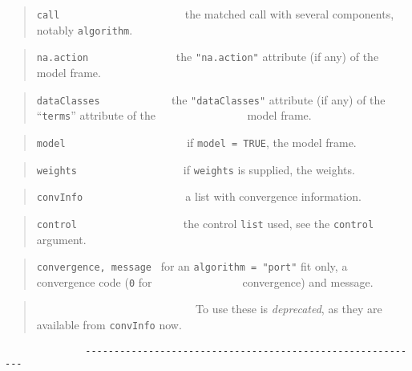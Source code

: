 \documentclass[
]{article}
\begin{document}
\begin{quote}
\texttt{call} ~ ~ ~ ~ ~ ~ ~ ~ ~ ~ ~ ~ ~ the matched call with several
components, notably \texttt{algorithm}.
\end{quote}

\begin{quote}
\texttt{na.action} ~ ~ ~ ~ ~ ~ ~ ~ ~ the \texttt{"na.action"} attribute
(if any) of the model frame.
\end{quote}

\begin{quote}
\texttt{dataClasses} ~ ~ ~ ~ ~ ~ ~ \(~\)the \texttt{"dataClasses"}
attribute (if any) of the ``\texttt{terms}'' attribute of the \newline
\(~~~~~~~~~~~~~~~~~~~~~~~~~~~~~~~~~~\) model frame.
\end{quote}

\begin{quote}
\texttt{model} ~ ~ ~ ~ ~ ~ ~ ~ ~ ~ ~ ~ ~if \texttt{model\ =\ TRUE}, the
model frame.
\end{quote}

\begin{quote}
\texttt{weights} ~ ~ ~ ~ ~ ~ ~ ~ ~ ~ ~ if \texttt{weights} is supplied,
the weights.
\end{quote}

\begin{quote}
\texttt{convInfo} ~ ~ ~ ~ ~ ~ ~ ~ ~ ~~ a list with convergence
information.
\end{quote}

\begin{quote}
\texttt{control} ~ ~ ~ ~ ~ ~ ~ ~ ~ ~ ~ the control \texttt{list} used,
see the \texttt{control} argument.
\end{quote}

\begin{quote}
\texttt{convergence,\ message} ~for an \texttt{algorithm\ =\ "port"} fit
only, a convergence code (\texttt{0} for \newline
\(~~~~~~~~~~~~~~~~~~~~~~~~~~~~~~~~~~~\)convergence) and message.
\end{quote}

\begin{quote}
~ ~ ~ ~ ~ ~ ~ ~ ~ ~ ~ ~ ~ ~ ~ ~ ~ To use these is \emph{deprecated}, as
they are available from \texttt{convInfo} now.
\end{quote}

\begin{verbatim}
              -----------------------------------------------------------
\end{verbatim}
\end{document}
